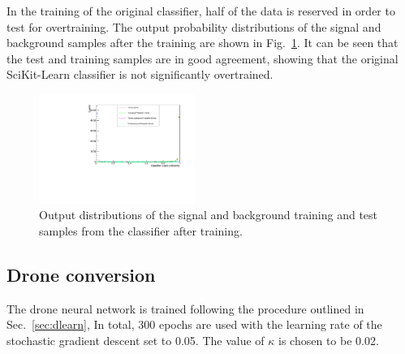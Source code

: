 \documentclass[final,5p,times,twocolumn]{elsarticle}
\begin{document}
In the training of the original classifier, half of the data is
reserved in order to test for overtraining.
The output probability distributions of the signal and background samples
after the training are shown in Fig.~\ref{fig:output}.
It can be seen that the test and training samples are in good agreement,
showing that the original SciKit-Learn classifier is not significantly overtrained.
\begin{figure}[t]
\centering
\includegraphics[width=0.45\textwidth]{event_probability.pdf}
\caption{\small 
Output distributions of the signal and background training and
test samples from the classifier after training.
}
\label{fig:output}
\end{figure}

\subsection{Drone conversion}

The drone neural network is trained following the procedure outlined in Sec.~\ref{sec:dlearn},
In total, 300 epochs are used with
the learning rate of the stochastic gradient descent set to 0.05.
The value of $\kappa$ is chosen to be 0.02.
\end{document}
